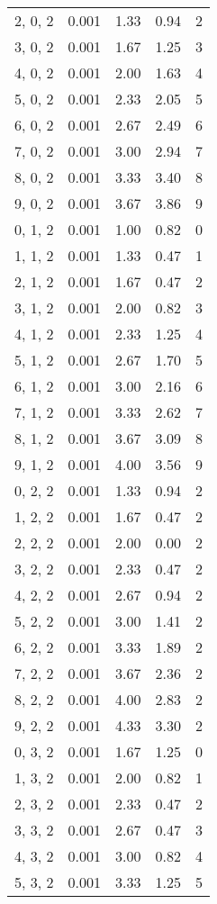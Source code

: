 \documentclass[12pt]{article}
\begin{document}
\begin{tabular}{c || c || c | c | c}
2, 0, 2 & 0.001 & 1.33 & 0.94 & 2 \\
3, 0, 2 & 0.001 & 1.67 & 1.25 & 3 \\
4, 0, 2 & 0.001 & 2.00 & 1.63 & 4 \\
5, 0, 2 & 0.001 & 2.33 & 2.05 & 5 \\
6, 0, 2 & 0.001 & 2.67 & 2.49 & 6 \\
7, 0, 2 & 0.001 & 3.00 & 2.94 & 7 \\
8, 0, 2 & 0.001 & 3.33 & 3.40 & 8 \\
9, 0, 2 & 0.001 & 3.67 & 3.86 & 9 \\
0, 1, 2 & 0.001 & 1.00 & 0.82 & 0 \\
1, 1, 2 & 0.001 & 1.33 & 0.47 & 1 \\
2, 1, 2 & 0.001 & 1.67 & 0.47 & 2 \\
3, 1, 2 & 0.001 & 2.00 & 0.82 & 3 \\
4, 1, 2 & 0.001 & 2.33 & 1.25 & 4 \\
5, 1, 2 & 0.001 & 2.67 & 1.70 & 5 \\
6, 1, 2 & 0.001 & 3.00 & 2.16 & 6 \\
7, 1, 2 & 0.001 & 3.33 & 2.62 & 7 \\
8, 1, 2 & 0.001 & 3.67 & 3.09 & 8 \\
9, 1, 2 & 0.001 & 4.00 & 3.56 & 9 \\
0, 2, 2 & 0.001 & 1.33 & 0.94 & 2 \\
1, 2, 2 & 0.001 & 1.67 & 0.47 & 2 \\
2, 2, 2 & 0.001 & 2.00 & 0.00 & 2 \\
3, 2, 2 & 0.001 & 2.33 & 0.47 & 2 \\
4, 2, 2 & 0.001 & 2.67 & 0.94 & 2 \\
5, 2, 2 & 0.001 & 3.00 & 1.41 & 2 \\
6, 2, 2 & 0.001 & 3.33 & 1.89 & 2 \\
7, 2, 2 & 0.001 & 3.67 & 2.36 & 2 \\
8, 2, 2 & 0.001 & 4.00 & 2.83 & 2 \\
9, 2, 2 & 0.001 & 4.33 & 3.30 & 2 \\
0, 3, 2 & 0.001 & 1.67 & 1.25 & 0 \\
1, 3, 2 & 0.001 & 2.00 & 0.82 & 1 \\
2, 3, 2 & 0.001 & 2.33 & 0.47 & 2 \\
3, 3, 2 & 0.001 & 2.67 & 0.47 & 3 \\
4, 3, 2 & 0.001 & 3.00 & 0.82 & 4 \\
5, 3, 2 & 0.001 & 3.33 & 1.25 & 5 \\

\end{tabular}
\end{document}
